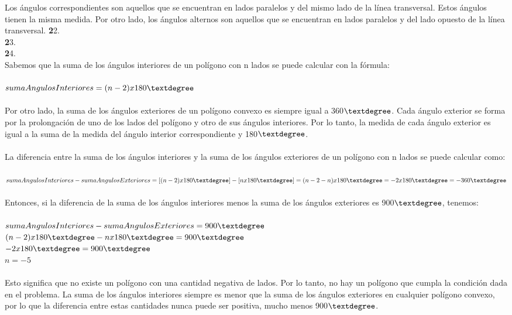 \documentclass{article}
\begin{document}
Los ángulos correspondientes son aquellos que se encuentran en lados paralelos y del mismo lado de la línea transversal. Estos ángulos tienen la misma medida. Por otro lado, los ángulos alternos son aquellos que se encuentran en lados paralelos y del lado opuesto de la línea transversal.
{\textbf 22. }\\
{\textbf 23. }\\
{\textbf 24. }\\
Sabemos que la suma de los ángulos interiores de un polígono con n lados se puede calcular con la fórmula:\\
\\
$sumaAngulosInteriores = (n - 2) x 180\textdegree$\\
\\
Por otro lado, la suma de los ángulos exteriores de un polígono convexo es siempre igual a 360$\textdegree$. Cada ángulo exterior se forma por la prolongación de uno de los lados del polígono y otro de sus ángulos interiores. Por lo tanto, la medida de cada ángulo exterior es igual a la suma de la medida del ángulo interior correspondiente y 180$\textdegree$.\\
\\
La diferencia entre la suma de los ángulos interiores y la suma de los ángulos exteriores de un polígono con n lados se puede calcular como:\\
\\
$sumaAngulosInteriores - sumaAngulosExteriores = [(n - 2) x 180\textdegree] - [n x 180\textdegree] = (n - 2 - n) x 180\textdegree = -2 x 180\textdegree = -360\textdegree$\\
\\
Entonces, si la diferencia de la suma de los ángulos interiores menos la suma de los ángulos exteriores es 900$\textdegree$, tenemos:\\
\\
$sumaAngulosInteriores - sumaAngulosExteriores = 900\textdegree$\\
$(n - 2) x 180\textdegree - n x 180\textdegree = 900\textdegree$\\
$-2 x 180\textdegree = 900\textdegree$\\
$n = -5$\\
\\
Esto significa que no existe un polígono con una cantidad negativa de lados. Por lo tanto, no hay un polígono que cumpla la condición dada en el problema. La suma de los ángulos interiores siempre es menor que la suma de los ángulos exteriores en cualquier polígono convexo, por lo que la diferencia entre estas cantidades nunca puede ser positiva, mucho menos 900$\textdegree$.\\
\end{document}

